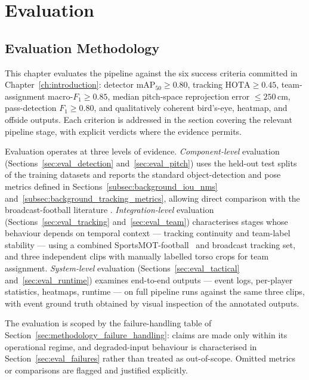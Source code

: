 \chapter{Evaluation}
\label{ch:evaluation}

\section{Evaluation Methodology}
\label{sec:eval_methodology}

This chapter evaluates the pipeline against the six success criteria
committed in Chapter~\ref{ch:introduction}: detector $\mathrm{mAP}_{50}
\geq 0.80$, tracking $\mathrm{HOTA} \geq 0.45$, team-assignment
macro-$F_1 \geq 0.85$, median pitch-space reprojection error
$\leq 250$\,cm, pass-detection $F_1 \geq 0.80$, and qualitatively
coherent bird's-eye, heatmap, and offside outputs. Each criterion is
addressed in the section covering the relevant pipeline stage, with
explicit verdicts where the evidence permits.

Evaluation operates at three levels of evidence.
\emph{Component-level} evaluation
(Sections~\ref{sec:eval_detection} and~\ref{sec:eval_pitch}) uses the
held-out test splits of the training datasets and reports the standard
object-detection and pose metrics defined in
Sections~\ref{subsec:background_iou_nms}
and~\ref{subsec:background_tracking_metrics}, allowing direct
comparison with the broadcast-football literature
\cite{Cioppa2022,Theiner2022,Magera2025}.
\emph{Integration-level} evaluation
(Sections~\ref{sec:eval_tracking} and~\ref{sec:eval_team})
characterises stages whose behaviour depends on temporal context —
tracking continuity and team-label stability — using a combined
SportsMOT-football~\cite{Cui2023SportsMOT} and broadcast tracking set,
and three independent clips with manually labelled torso crops for
team assignment.
\emph{System-level} evaluation
(Sections~\ref{sec:eval_tactical} and~\ref{sec:eval_runtime}) examines
end-to-end outputs — event logs, per-player statistics, heatmaps,
runtime — on full pipeline runs against the same three clips, with
event ground truth obtained by visual inspection of the annotated
outputs.

The evaluation is scoped by the failure-handling table of
Section~\ref{sec:methodology_failure_handling}: claims are made only
within its operational regime, and degraded-input behaviour is
characterised in Section~\ref{sec:eval_failures} rather than treated
as out-of-scope. Omitted metrics or comparisons are flagged and
justified explicitly.

